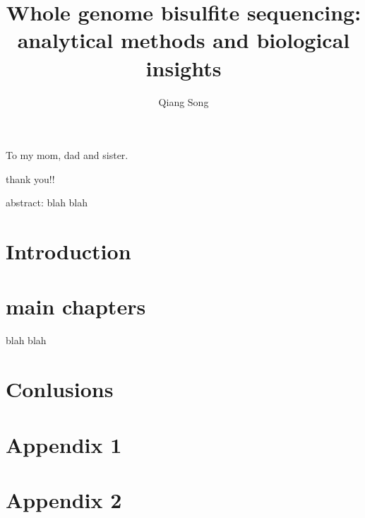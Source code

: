 \documentclass{USC-Thesis}
\title{Whole genome bisulfite sequencing:  \break
 analytical methods and  biological insights}
\author{Qiang Song}
\numberwithin{equation}{chapter}
\begin{document}

\maketitle

To my mom, dad and sister.

thank you!!


\tableofcontents  %
\listoftables     %
\listoffigures    %

abstract: blah blah


\mainmatter

\chapter{Introduction}
\chapter{main chapters}
blah blah
\chapter{Conlusions}




\appendix
\chapter{Appendix 1}
\chapter{Appendix 2}
\end{document}
